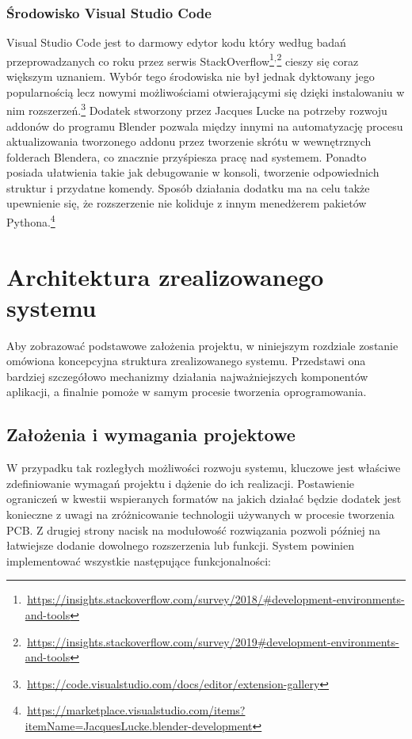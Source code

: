 \documentclass{xmgr}
\begin{document}
\subsection{Środowisko Visual Studio Code}
Visual Studio Code jest to darmowy edytor kodu który według badań przeprowadzanych co roku przez serwis StackOverflow\footnote{\,\url{https://insights.stackoverflow.com/survey/2018/\#development-environments-and-tools}}$^{,}$\footnote{\,\url{https://insights.stackoverflow.com/survey/2019\#development-environments-and-tools}} cieszy się coraz większym uznaniem. Wybór tego środowiska nie był jednak dyktowany jego popularnością lecz nowymi możliwościami otwierającymi się dzięki instalowaniu w nim rozszerzeń.\footnote{\,\url{https://code.visualstudio.com/docs/editor/extension-gallery}} Dodatek stworzony przez Jacques Lucke na potrzeby rozwoju addonów do programu Blender pozwala między innymi na automatyzację procesu aktualizowania tworzonego addonu przez tworzenie skrótu w wewnętrznych folderach Blendera, co znacznie przyśpiesza pracę nad systemem. Ponadto posiada ułatwienia takie jak debugowanie w konsoli, tworzenie odpowiednich struktur i przydatne komendy. Sposób działania dodatku ma na celu także upewnienie się, że rozszerzenie nie koliduje z innym menedżerem pakietów Pythona.\footnote{\,\url{https://marketplace.visualstudio.com/items?itemName=JacquesLucke.blender-development}} 

\chapter{Architektura zrealizowanego systemu}
Aby zobrazować podstawowe założenia projektu, w niniejszym rozdziale zostanie omówiona koncepcyjna struktura zrealizowanego systemu. Przedstawi ona bardziej szczegółowo mechanizmy działania najważniejszych komponentów aplikacji, a finalnie pomoże w samym procesie tworzenia oprogramowania.

\section{Założenia i wymagania projektowe}
W przypadku tak rozległych możliwości rozwoju systemu, kluczowe jest właściwe zdefiniowanie wymagań projektu i dążenie do ich realizacji. Postawienie ograniczeń w kwestii wspieranych formatów na jakich działać będzie dodatek jest konieczne z uwagi na zróżnicowanie technologii używanych w procesie tworzenia PCB. Z drugiej strony nacisk na modułowość rozwiązania pozwoli później na łatwiejsze dodanie dowolnego rozszerzenia lub funkcji.
System powinien implementować wszystkie następujące funkcjonalności:
\end{document}
